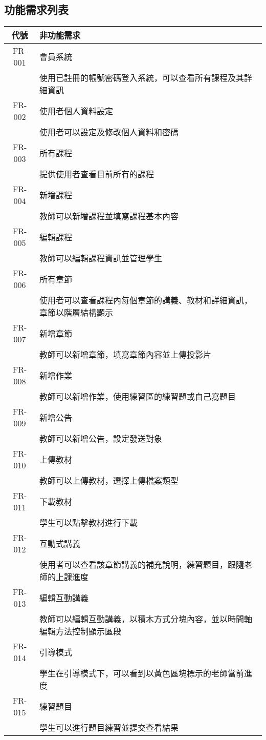\documentclass[12pt]{article}
\begin{document}
\subsection{功能需求列表}
\begin{table}[H]
  \centering
  \begin{tabular}{|c|p{10cm}|}
    \hline
    \textbf{代號} & \textbf{非功能需求} \\
    \hline
    FR-001 & 會員系統 \\ 
    & 使用已註冊的帳號密碼登入系統，可以查看所有課程及其詳細資訊 \\  \hline
    FR-002 & 使用者個人資料設定 \\ 
    & 使用者可以設定及修改個人資料和密碼 \\  \hline
    FR-003 & 所有課程 \\ 
    & 提供使用者查看目前所有的課程 \\  \hline
    FR-004 & 新增課程 \\ 
    & 教師可以新增課程並填寫課程基本內容 \\  \hline
    FR-005 & 編輯課程 \\ 
    & 教師可以編輯課程資訊並管理學生 \\  \hline
    FR-006 & 所有章節 \\ 
    & 使用者可以查看課程內每個章節的講義、教材和詳細資訊，章節以階層結構顯示 \\  \hline
    FR-007 & 新增章節 \\ 
    & 教師可以新增章節，填寫章節內容並上傳投影片 \\  \hline
    FR-008 & 新增作業 \\ 
    & 教師可以新增作業，使用練習區的練習題或自己寫題目 \\  \hline
    FR-009 & 新增公告 \\ 
    & 教師可以新增公告，設定發送對象 \\  \hline
    FR-010 & 上傳教材 \\ 
    & 教師可以上傳教材，選擇上傳檔案類型 \\  \hline
    FR-011 & 下載教材 \\ 
    & 學生可以點擊教材進行下載 \\  \hline
    FR-012 & 互動式講義 \\ 
    & 使用者可以查看該章節講義的補充說明，練習題目，跟隨老師的上課進度 \\  \hline
    FR-013 & 編輯互動講義 \\ 
    & 教師可以編輯互動講義，以積木方式分塊內容，並以時間軸編輯方法控制顯示區段 \\  \hline
    FR-014 & 引導模式 \\ 
    & 學生在引導模式下，可以看到以黃色區塊標示的老師當前進度 \\  \hline
    FR-015 & 練習題目 \\ 
    & 學生可以進行題目練習並提交查看結果 \\  \hline
  \end{tabular}
\end{table}
\end{document}
